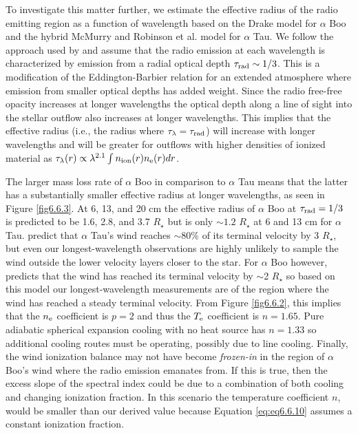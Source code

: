 To investigate this matter further,  we estimate the effective radius of the radio emitting region as a function of wavelength based on the Drake model for $\alpha$ Boo and the hybrid McMurry and Robinson et al. model for $\alpha$ Tau. We follow the approach used by \cite{cassinelli_1977} and assume that the radio emission at each wavelength is characterized by emission from a radial optical depth $\tau _{\rm{rad}}\sim 1/3$. This is a modification of the Eddington-Barbier relation for an extended atmosphere where emission from smaller optical depths has added weight. Since the radio free-free opacity increases at longer wavelengths the optical depth along a line of sight into the stellar outflow also increases at longer wavelengths. This implies that the effective radius (i.e., the radius where $\tau _{\lambda} = \tau _{\rm{rad}}$) will increase with longer wavelengths and will be greater for outflows with higher densities of ionized material as $\tau _{\lambda}(r) \propto \lambda ^{2.1} \int n_{\rm{ion}}(r)n_{\rm{e}}(r) dr$. 

The larger mass loss rate of $\alpha$ Boo in comparison to $\alpha$ Tau means that the latter has a substantially smaller effective radius at longer wavelengths, as seen in Figure \ref{fig6.6.3}. At 6, 13, and 20 cm the effective radius of $\alpha$ Boo at $\tau _{\rm{rad}}=1/3$ is predicted to be 1.6, 2.8, and 3.7 $R_{\star}$ but is only $\sim 1.2$ $R_{\star}$ at 6 and 13 cm for $\alpha$ Tau. \cite{robinson_1998} predict that $\alpha$ Tau's wind reaches $\sim$80\% of its terminal velocity by 3 $R_{\star}$, but even our longest-wavelength observations are highly unlikely to sample the wind outside the lower velocity layers closer to the star. For $\alpha$ Boo however, \cite{drake_1985} predicts that the wind has reached its terminal velocity by $\sim$2 $R_{\star}$ so based on this model our longest-wavelength measurements are of the region where the wind has reached a steady terminal velocity. From Figure \ref{fig6.6.2}, this implies that the $n_{\rm{e}}$ coefficient is $p=2$ and thus the $T_{\rm{e}}$ coefficient is $n=1.65$. Pure adiabatic spherical expansion cooling with no heat source has $n=1.33$ so additional cooling routes must be operating, possibly due to line cooling. Finally, the wind ionization balance may not have become \textit{frozen-in} in the region of $\alpha$ Boo's wind where the radio emission emanates from. If this is true, then the excess slope of the spectral index could be due to a combination of both cooling and changing ionization fraction. In this scenario the temperature coefficient $n$, would be smaller than our derived value because Equation \ref{eq:eq6.6.10} assumes a constant ionization fraction.

